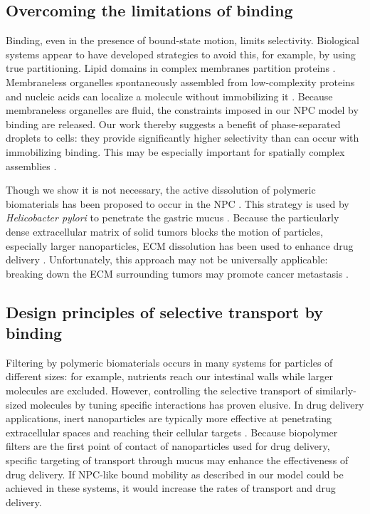 \subsection*{Overcoming the limitations of binding}
Binding, even in the presence of bound-state motion, limits
selectivity.  Biological systems appear to have developed strategies
to avoid this, for example, by using true partitioning.  Lipid domains
in complex membranes partition proteins \cite{simons11}.  Membraneless
organelles spontaneously assembled from low-complexity proteins and
nucleic acids can localize a molecule without immobilizing it
\cite{brangwynne15}.  Because membraneless organelles are fluid, the
constraints imposed in our NPC model by binding are released.  Our
work thereby suggests a benefit of phase-separated droplets to cells:
they provide significantly higher selectivity than can occur with
immobilizing binding. This may be especially important for spatially
complex assemblies \cite{feric16}.

Though we show it is not necessary, the active dissolution of
polymeric biomaterials has been proposed to occur in the NPC
\cite{ribbeck01}. This strategy is used by \textit{Helicobacter
  pylori} to penetrate the gastric mucus \cite{celli09}. Because the
particularly dense extracellular matrix of solid tumors blocks the
motion of particles, especially larger nanoparticles, ECM dissolution
has been used to enhance drug delivery \cite{zhou13}. Unfortunately,
this approach may not be universally applicable: breaking down the ECM
surrounding tumors may promote cancer metastasis \cite{miao15}.

\subsection*{Design principles of selective transport by binding}

Filtering by polymeric biomaterials occurs in many systems for
particles of different sizes: for example, nutrients reach our
intestinal walls while larger molecules are excluded.  However,
controlling the selective transport of similarly-sized molecules by
tuning specific interactions has proven elusive. In drug delivery
applications, inert nanoparticles are typically more effective at penetrating
extracellular spaces and reaching their cellular targets
\cite{witten17}. Because biopolymer filters are the first point of
contact of nanoparticles used for drug delivery, specific targeting of
transport through mucus may enhance the effectiveness of drug
delivery. If NPC-like bound mobility as described in our model could
be achieved in these systems, it would increase the rates of
transport and drug delivery. 
